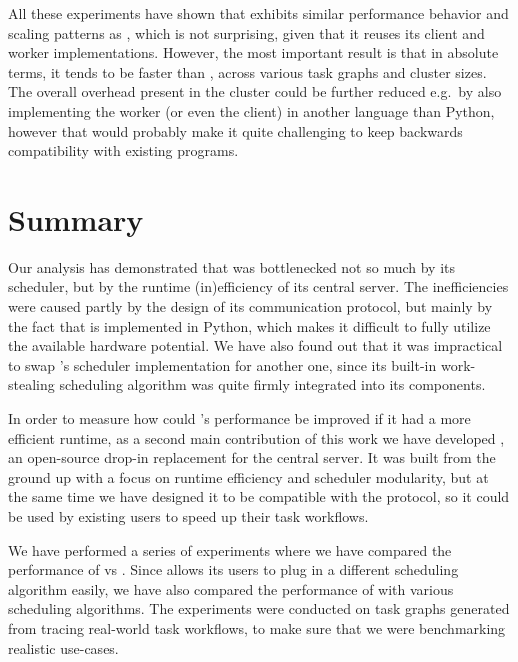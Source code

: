 All these experiments have shown that \rsds{} exhibits similar performance
behavior and scaling patterns as \dask{}, which is not surprising, given that
it reuses its client and worker implementations. However, the most important result is that in
absolute terms, it tends to be faster than \dask{}, across various task graphs
and cluster sizes. The overall overhead present in the \dask{} cluster could be
further reduced e.g.\ by also implementing the worker (or even the client) in another language than
Python, however that would probably make it quite challenging to keep backwards compatibility with
existing \dask{} programs.

\section{Summary}

Our analysis has demonstrated that \dask{} was bottlenecked not so much by its
scheduler, but by the runtime (in)efficiency of its central server. The inefficiencies were caused
partly by the design of its communication protocol, but mainly by the fact that
\dask{} is implemented in Python, which makes it difficult to fully utilize the
available hardware potential. We have also found out that it was impractical to swap
\dask{}'s scheduler implementation for another one, since its built-in
work-stealing scheduling algorithm was quite firmly integrated into its components.

In order to measure how could \dask{}'s performance be improved if it had a
more efficient runtime, as a second main contribution of this work we have developed
\rsds{}, an open-source drop-in replacement for the \dask{}
central server. It was built from the ground up with a focus on runtime
efficiency and scheduler modularity, but at the same time we have designed it to be compatible with
the \dask{} protocol, so it could be used by existing
\dask{} users to speed up their task workflows.

We have performed a series of experiments where we have compared the performance of
\rsds{} vs \dask{}. Since \rsds{}
allows its users to plug in a different scheduling algorithm easily, we have also compared the
performance of \rsds{} with various scheduling algorithms. The experiments were
conducted on task graphs generated from tracing real-world \dask{} task
workflows, to make sure that we were benchmarking realistic use-cases.

